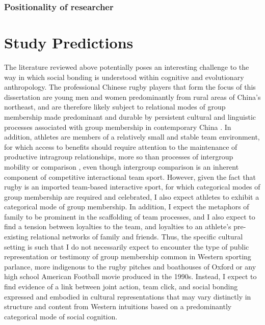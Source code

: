 {\subsubsection{Positionality of researcher}












\section{Study Predictions}
The literature reviewed above potentially poses an interesting challenge to the way in which social bonding is understood within cognitive and evolutionary anthropology.  The professional Chinese rugby players that form the focus of this dissertation are young men and women predominantly from rural areas of China's northeast, and are therefore likely subject to relational modes of group membership made predominant and durable by persistent cultural and linguistic processes associated with group membership in contemporary China \citep{Liu2009}.  In addition, athletes are members of a relatively small and stable team environment, for which access to benefits should require attention to the maintenance of productive intragroup relationships, more so than processes of intergroup mobility or comparison \citep{Schug2010}, even though intergroup comparison is an inherent component of competitive interactional team sport. However, given the fact that rugby is an imported team-based interactive sport, for which categorical modes of group membership are required and celebrated, I also expect athletes to exhibit a categorical mode of group membership.
In addition, I expect the metaphors of family to be prominent in the scaffolding of team processes, and I also expect to find a tension between loyalties to the team, and loyalties to an athlete's pre-existing relational networks of family and friends\citep{Yang1994}.  Thus, the specific cultural setting is such that I do not necessarily expect to encounter the type of public representation or testimony of group membership common in Western sporting parlance, more indigenous to the rugby pitches and boathouses of Oxford or any high school American Football movie produced in the 1990s.  Instead, I expect to find evidence of a link between joint action, team click, and social bonding expressed and embodied in cultural representations that may vary distinctly in structure and content from Western intuitions based on a predominantly categorical mode of social cognition.

}
